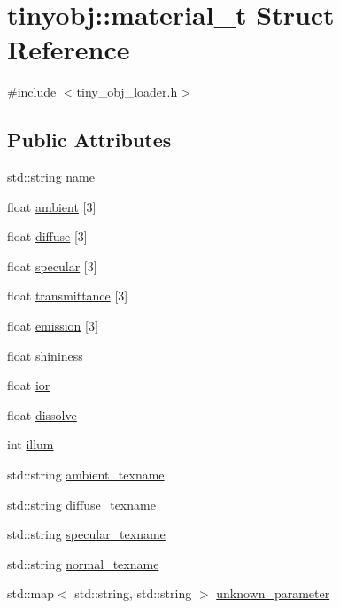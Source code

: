 \hypertarget{structtinyobj_1_1material__t}{}\section{tinyobj\+:\+:material\+\_\+t Struct Reference}
\label{structtinyobj_1_1material__t}


{\ttfamily \#include $<$tiny\+\_\+obj\+\_\+loader.\+h$>$}

\subsection*{Public Attributes}
\begin{DoxyCompactItemize}
\item 
std\+::string \hyperlink{structtinyobj_1_1material__t_a41fde82dd0ec383b1d4ee258c4e4a1b9}{name}
\item 
float \hyperlink{structtinyobj_1_1material__t_a43b73b4858f8901eea238e007c8719ce}{ambient} \mbox{[}3\mbox{]}
\item 
float \hyperlink{structtinyobj_1_1material__t_a6ca52b575604328ad4d5674b2891a780}{diffuse} \mbox{[}3\mbox{]}
\item 
float \hyperlink{structtinyobj_1_1material__t_a7bbad62eae583d5c381909f1f4f76471}{specular} \mbox{[}3\mbox{]}
\item 
float \hyperlink{structtinyobj_1_1material__t_a40e7cf9bc5c2cf9048152d39be6b82d7}{transmittance} \mbox{[}3\mbox{]}
\item 
float \hyperlink{structtinyobj_1_1material__t_ab84b63eb4a936b6fba7392cdcea6d6f6}{emission} \mbox{[}3\mbox{]}
\item 
float \hyperlink{structtinyobj_1_1material__t_a4f893e510fd30f63c687a8ad53000d15}{shininess}
\item 
float \hyperlink{structtinyobj_1_1material__t_aaa7d5495ba26b249e2ea3c368b505b56}{ior}
\item 
float \hyperlink{structtinyobj_1_1material__t_ac7dfb767305c4225c5b3a964acb9498d}{dissolve}
\item 
int \hyperlink{structtinyobj_1_1material__t_af846245315bd70c1a4f815dfdd6b80cc}{illum}
\item 
std\+::string \hyperlink{structtinyobj_1_1material__t_ae988eed637f368374becbb672798a45e}{ambient\+\_\+texname}
\item 
std\+::string \hyperlink{structtinyobj_1_1material__t_ad7f71a301a261fca07d2e50edccc792d}{diffuse\+\_\+texname}
\item 
std\+::string \hyperlink{structtinyobj_1_1material__t_aed8c38d64472ba0db5186dba800b1b34}{specular\+\_\+texname}
\item 
std\+::string \hyperlink{structtinyobj_1_1material__t_a7512ccf46044357bea1739d583871578}{normal\+\_\+texname}
\item 
std\+::map$<$ std\+::string, std\+::string $>$ \hyperlink{structtinyobj_1_1material__t_a18b700227c94d410ed1aa550c7fa9226}{unknown\+\_\+parameter}
\end{DoxyCompactItemize}


